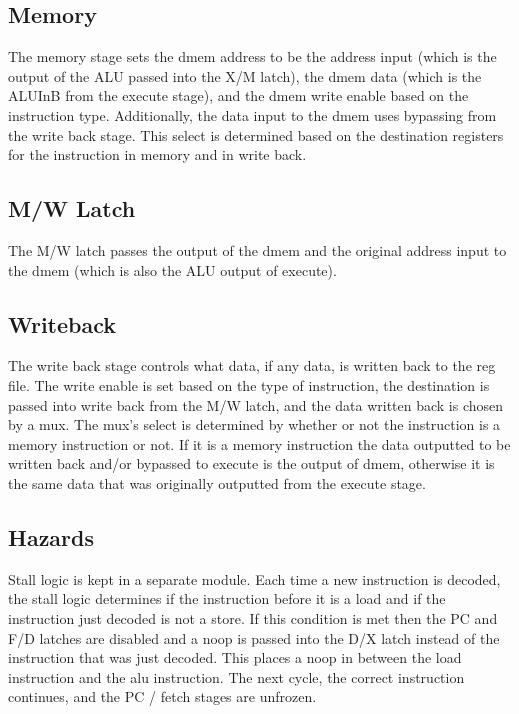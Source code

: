\documentclass{article}
\begin{document}
\subsection{Memory}
The memory stage sets the dmem address to be the address input (which is the output of the ALU passed into the X/M latch), the dmem data (which is the ALUInB from the execute stage), and the dmem write enable based on the instruction type. Additionally, the data input to the dmem uses bypassing from the write back stage. This select is determined based on the destination registers for the instruction in memory and in write back.

\subsection{M/W Latch}
The M/W latch passes the output of the dmem and the original address input to the dmem (which is also the ALU output of execute). 

\subsection{Writeback}
The write back stage controls what data, if any data, is written back to the reg file. The write enable is set based on the type of instruction, the destination is passed into write back from the M/W latch, and the data written back is chosen by a mux. The mux's select is determined by whether or not the instruction is a memory instruction or not. If it is a memory instruction the data outputted to be written back and/or bypassed to execute is the output of dmem, otherwise it is the same data that was originally outputted from the execute stage. 

\subsection{Hazards}
Stall logic is kept in a separate module. Each time a new instruction is decoded, the stall logic determines if the instruction before it is a load and if the instruction just decoded is not a store. If this condition is met then the PC and F/D latches are disabled and a noop is passed into the D/X latch instead of the instruction that was just decoded. This places a noop in between the load instruction and the alu instruction. The next cycle, the correct instruction continues, and the PC / fetch stages are unfrozen.
\end{document}
